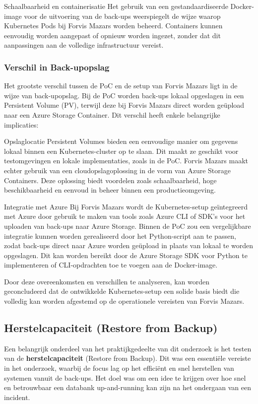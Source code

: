 \begin{itemize}
Schaalbaarheid en containerisatie
Het gebruik van een gestandaardiseerde Docker-image voor de uitvoering van de back-ups weerspiegelt de wijze waarop Kubernetes Pods bij Forvis Mazars worden beheerd. Containers kunnen eenvoudig worden aangepast of opnieuw worden ingezet, zonder dat dit aanpassingen aan de volledige infrastructuur vereist.

\subsubsection*{Verschil in Back-upopslag}

Het grootste verschil tussen de PoC en de setup van Forvis Mazars ligt in de wijze van back-upopslag. Bij de PoC worden back-ups lokaal opgeslagen in een Persistent Volume (PV), terwijl deze bij Forvis Mazars direct worden geüpload naar een Azure Storage Container. Dit verschil heeft enkele belangrijke implicaties:

Opslaglocatie
Persistent Volumes bieden een eenvoudige manier om gegevens lokaal binnen een Kubernetes-cluster op te slaan. Dit maakt ze geschikt voor testomgevingen en lokale implementaties, zoals in de PoC. Forvis Mazars maakt echter gebruik van een cloudopslagoplossing in de vorm van Azure Storage Containers. Deze oplossing biedt voordelen zoals schaalbaarheid, hoge beschikbaarheid en eenvoud in beheer binnen een productieomgeving.

Integratie met Azure
Bij Forvis Mazars wordt de Kubernetes-setup geïntegreerd met Azure door gebruik te maken van tools zoals Azure CLI of SDK’s voor het uploaden van back-ups naar Azure Storage. Binnen de PoC zou een vergelijkbare integratie kunnen worden gerealiseerd door het Python-script aan te passen, zodat back-ups direct naar Azure worden geüpload in plaats van lokaal te worden opgeslagen. Dit kan worden bereikt door de Azure Storage SDK voor Python te implementeren of CLI-opdrachten toe te voegen aan de Docker-image.

Door deze overeenkomsten en verschillen te analyseren, kan worden geconcludeerd dat de ontwikkelde Kubernetes-setup een solide basis biedt die volledig kan worden afgestemd op de operationele vereisten van Forvis Mazars.


\subsection{Herstelcapaciteit (Restore from Backup)}
Een belangrijk onderdeel van het praktijkgedeelte van dit onderzoek is het testen van de \textbf{herstelcapaciteit} (Restore from Backup). Dit was een essentiële vereiste in het onderzoek, waarbij de focus lag op het efficiënt en snel herstellen van systemen vanuit de back-ups. Het doel was om een idee te krijgen over hoe snel en betrouwbaar een databank up-and-running kan zijn na het ondergaan van een incident.


\end{itemize}
